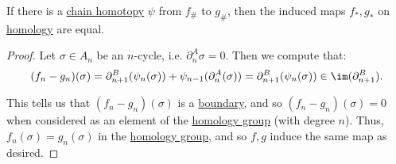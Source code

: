 \begin{theorem}\label{thm:chain-homotopies-on-homology}
	If there is a \hyperref[def:chain-homotopy]{chain homotopy} \(\psi\) from \(f_\#\) to \(g_\#\), then the induced maps
	\(f_\ast, g_\ast\) on \hyperref[def:homology-group]{homology} are equal.
\end{theorem}
\begin{proof}
	Let \(\sigma \in A_n\) be an \(n\)-cycle, i.e. \(\partial_n^A \sigma = 0\). Then we compute that:
	\[
		(f_n - g_n)(\sigma) = \partial_{n + 1}^B(\psi_n(\sigma)) + \psi_{n - 1}(\partial_n^A(\sigma)) = \partial_{n + 1}^B(\psi_n(\sigma)) \in \im (\partial^B_{n + 1}).
	\]

	This tells us that \((f_n - g_n)(\sigma)\) is a \hyperref[def:boundary]{boundary}, and so \((f_n - g_n)(\sigma) = 0\) when considered as an element of
	the \hyperref[def:homology-group]{homology group} (with degree \(n\)).
	Thus, \(f_n(\sigma) = g_n(\sigma)\) in the \hyperref[def:homology-group]{homology group}, and so \(f, g\) induce the same map as desired.
\end{proof}

